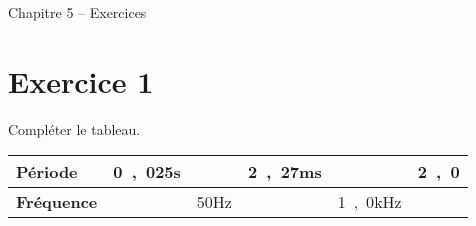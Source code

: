 \documentclass[12pt,a4paper]{article}
\begin{document}
\begin{header}
Chapitre 5 -- Exercices
\end{header}

\section*{Exercice 1}

Compléter le tableau.

\begin{center}
\begin{tabular}{|l|c|c|c|c|c|}
\hline
\textbf{Période} 		& \unit{0{,}025}{s}	&							& \unit{2{,}27}{ms}	&									& \unit{2{,}0}{\micro\second}\\
\hline
\textbf{Fréquence}	&								& \unit{50}{Hz}	&									& \unit{1{,}0}{kHz}		& \\
\hline
\end{tabular}
\end{center}
\end{document}
